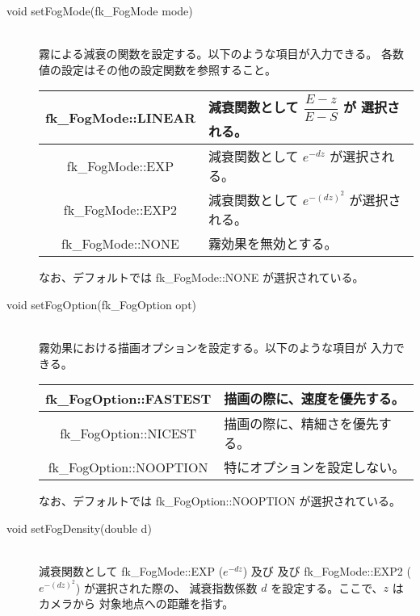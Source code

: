 \begin{description}
 \item[\hspace*{0.6cm}void setFogMode(fk\_FogMode mode)] ~ \\
	霧による減衰の関数を設定する。以下のような項目が入力できる。
	各数値の設定はその他の設定関数を参照すること。
	\begin{center}
	\begin{tabular}{|c|p{7cm}|}
	\hline
	fk\_FogMode::LINEAR & 減衰関数として \(\dfrac{E - z}{E - S}\) が
		選択される。\\ \hline
	fk\_FogMode::EXP & 減衰関数として \(e^{-dz}\) が選択される。\\ \hline
	fk\_FogMode::EXP2 & 減衰関数として \(e^{-(dz)^2}\) が選択される。\\ \hline
	fk\_FogMode::NONE & 霧効果を無効とする。\\ \hline
	\end{tabular}
	\end{center}
	なお、デフォルトでは fk\_FogMode::NONE が選択されている。\\

 \item[\hspace*{0.6cm}void setFogOption(fk\_FogOption opt)] ~ \\
	霧効果における描画オプションを設定する。以下のような項目が
	入力できる。
	\begin{center}
	\begin{tabular}{|c|p{7cm}|}
	\hline
	fk\_FogOption::FASTEST & 描画の際に、速度を優先する。\\ \hline
	fk\_FogOption::NICEST & 描画の際に、精細さを優先する。\\ \hline
	fk\_FogOption::NOOPTION & 特にオプションを設定しない。\\ \hline
	\end{tabular}
	\end{center}
	なお、デフォルトでは fk\_FogOption::NOOPTION が選択されている。\\

 \item[\hspace*{0.6cm}void setFogDensity(double d)] ~ \\
	減衰関数として fk\_FogMode::EXP (\(e^{-dz}\)) 及び
	及び fk\_FogMode::EXP2 (\(e^{-(dz)^2}\)) が選択された際の、	
	減衰指数係数 \(d\) を設定する。ここで、\(z\) はカメラから
	対象地点への距離を指す。\\


\end{description}
